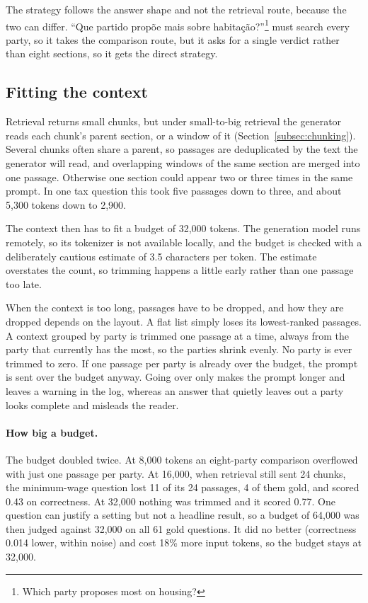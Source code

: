 The strategy follows the answer shape and not the retrieval route, because the
two can differ. ``Que partido propõe mais sobre habitação?''\footnote{Which
party proposes most on housing?} must search every party, so it takes the
comparison route, but it asks for a single verdict rather than eight sections,
so it gets the direct strategy.

\subsection{Fitting the context} \label{subsec:context}

Retrieval returns small chunks, but under small-to-big retrieval the generator
reads each chunk's parent section, or a window of it
(Section~\ref{subsec:chunking}). Several chunks often share a parent, so
passages are deduplicated by the text the generator will read, and overlapping
windows of the same section are merged into one passage. Otherwise one section
could appear two or three times in the same prompt. In one tax question this
took five passages down to three, and about 5,300 tokens down to 2,900.

The context then has to fit a budget of 32,000 tokens. The generation model
runs remotely, so its tokenizer is not available locally, and the budget is
checked with a deliberately cautious estimate of 3.5 characters per token. The
estimate overstates the count, so trimming happens a little early rather than
one passage too late.

When the context is too long, passages have to be dropped, and how they are
dropped depends on the layout. A flat list simply loses its lowest-ranked
passages. A context grouped by party is trimmed one passage at a time, always
from the party that currently has the most, so the parties shrink evenly. No
party is ever trimmed to zero. If one passage per party is already over the
budget, the prompt is sent over the budget anyway. Going over only makes the
prompt longer and leaves a warning in the log, whereas an answer that quietly
leaves out a party looks complete and misleads the reader.

\paragraph{How big a budget.} The budget doubled twice. At 8,000 tokens an
eight-party comparison overflowed with just one passage per party. At 16,000,
when retrieval still sent 24 chunks, the minimum-wage question lost 11 of its
24 passages, 4 of them gold, and scored 0.43 on correctness. At 32,000 nothing
was trimmed and it scored 0.77. One question can justify a setting but not a
headline result, so a budget of 64,000 was then judged against 32,000 on all
61 gold questions. It did no better (correctness 0.014 lower, within noise)
and cost 18\% more input tokens, so the budget stays at 32,000.

